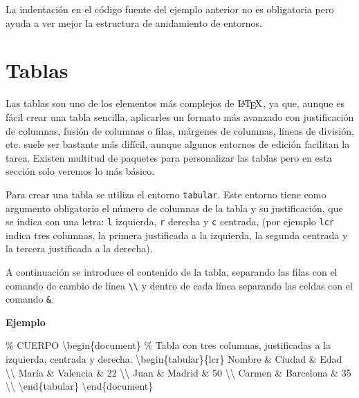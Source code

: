 \documentclass[
  a4paper,
]{scrreport}
\newenvironment{Shaded}{\begin{snugshade}}{\end{snugshade}}
\newcommand{\CommentTok}[1]{\textcolor[rgb]{0.37,0.37,0.37}{#1}}
\newcommand{\ExtensionTok}[1]{\textcolor[rgb]{0.00,0.23,0.31}{#1}}
\newcommand{\FunctionTok}[1]{\textcolor[rgb]{0.28,0.35,0.67}{#1}}
\newcommand{\KeywordTok}[1]{\textcolor[rgb]{0.00,0.23,0.31}{#1}}
\newcommand{\NormalTok}[1]{\textcolor[rgb]{0.00,0.23,0.31}{#1}}
\newcommand{\OperatorTok}[1]{\textcolor[rgb]{0.37,0.37,0.37}{#1}}
\begin{document}
La indentación en el código fuente del ejemplo anterior no es
obligatoria pero ayuda a ver mejor la estructura de anidamiento de
entornos.


\hypertarget{sec-tablas}{%
\chapter{Tablas}\label{sec-tablas}}

Las tablas son uno de los elementos más complejos de \(\text{\LaTeX}\),
ya que, aunque es fácil crear una tabla sencilla, aplicarles un formato
más avanzado con justificación de columnas, fusión de columnas o filas,
márgenes de columnas, líneas de división, etc. suele ser bastante más
difícil, aunque algunos entornos de edición facilitan la tarea. Existen
multitud de paquetes para personalizar las tablas pero en esta sección
solo veremos lo más básico.

Para crear una tabla se utiliza el entorno \texttt{tabular}. Este
entorno tiene como argumento obligatorio el número de columnas de la
tabla y su justificación, que se indica con una letra: \texttt{l}
izquierda, \texttt{r} derecha y \texttt{c} centrada, (por ejemplo
\texttt{lcr} indica tres columnas, la primera justificada a la
izquierda, la segunda centrada y la tercera justificada a la derecha).

A continuación se introduce el contenido de la tabla, separando las
filas con el comando de cambio de línea
\texttt{\textbackslash{}\textbackslash{}} y dentro de cada línea
separando las celdas con el comando \texttt{\&}.

\textbf{Ejemplo}

\begin{Shaded}
\begin{Highlighting}[]
\CommentTok{\% CUERPO}
\KeywordTok{\textbackslash{}begin}\NormalTok{\{}\ExtensionTok{document}\NormalTok{\}}
\CommentTok{\% Tabla con tres columnas, justificadas a la izquierda, centrada y derecha.}
\KeywordTok{\textbackslash{}begin}\NormalTok{\{}\ExtensionTok{tabular}\NormalTok{\}\{lcr\}}
\NormalTok{Nombre }\OperatorTok{\&}\NormalTok{ Ciudad }\OperatorTok{\&}\NormalTok{ Edad }\FunctionTok{\textbackslash{}\textbackslash{}}
\NormalTok{María }\OperatorTok{\&}\NormalTok{ Valencia }\OperatorTok{\&}\NormalTok{ 22 }\FunctionTok{\textbackslash{}\textbackslash{}}
\NormalTok{Juan }\OperatorTok{\&}\NormalTok{ Madrid }\OperatorTok{\&}\NormalTok{ 50 }\FunctionTok{\textbackslash{}\textbackslash{}}
\NormalTok{Carmen }\OperatorTok{\&}\NormalTok{ Barcelona }\OperatorTok{\&}\NormalTok{ 35 }\FunctionTok{\textbackslash{}\textbackslash{}}
\KeywordTok{\textbackslash{}end}\NormalTok{\{}\ExtensionTok{tabular}\NormalTok{\}}
\KeywordTok{\textbackslash{}end}\NormalTok{\{}\ExtensionTok{document}\NormalTok{\}}
\end{Highlighting}
\end{Shaded}
\end{document}

